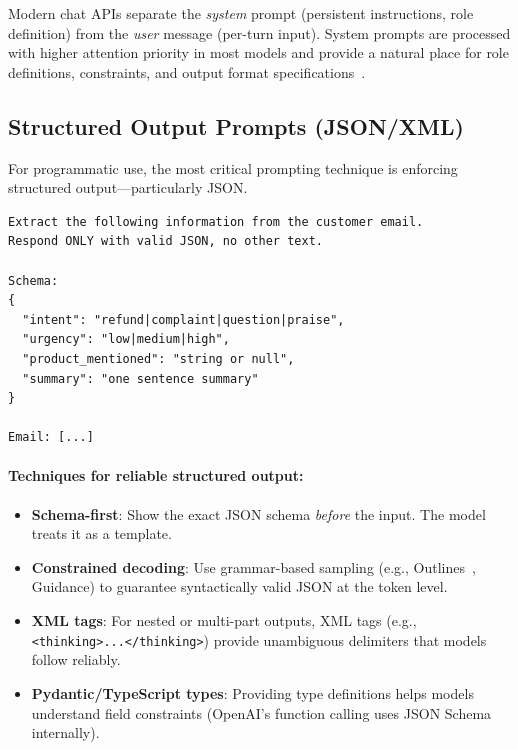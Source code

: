 Modern chat APIs separate the \emph{system} prompt (persistent instructions, role definition) from the \emph{user} message (per-turn input). System prompts are processed with higher attention priority in most models and provide a natural place for role definitions, constraints, and output format specifications~\cite{openai2023gpt4}.

\subsection{Structured Output Prompts (JSON/XML)}
\label{structured-output-prompts-jsonxml}

For programmatic use, the most critical prompting technique is enforcing structured output---particularly JSON.

\begin{examplebox}
\begin{lstlisting}
Extract the following information from the customer email.
Respond ONLY with valid JSON, no other text.

Schema:
{
  "intent": "refund|complaint|question|praise",
  "urgency": "low|medium|high",
  "product_mentioned": "string or null",
  "summary": "one sentence summary"
}

Email: [...]
\end{lstlisting}
\end{examplebox}

\paragraph{Techniques for reliable structured output:}
\label{techniques-for-reliable-structured-output}

\begin{itemize}
  \item \textbf{Schema-first}: Show the exact JSON schema \emph{before} the input. The model treats it as a template.
  \item \textbf{Constrained decoding}: Use grammar-based sampling (e.g., Outlines~\cite{willard2023outlines}, Guidance) to guarantee syntactically valid JSON at the token level.
  \item \textbf{XML tags}: For nested or multi-part outputs, XML tags (e.g., \texttt{<thinking>...</thinking>}) provide unambiguous delimiters that models follow reliably.
  \item \textbf{Pydantic/TypeScript types}: Providing type definitions helps models understand field constraints (OpenAI’s function calling uses JSON Schema internally).
\end{itemize}

